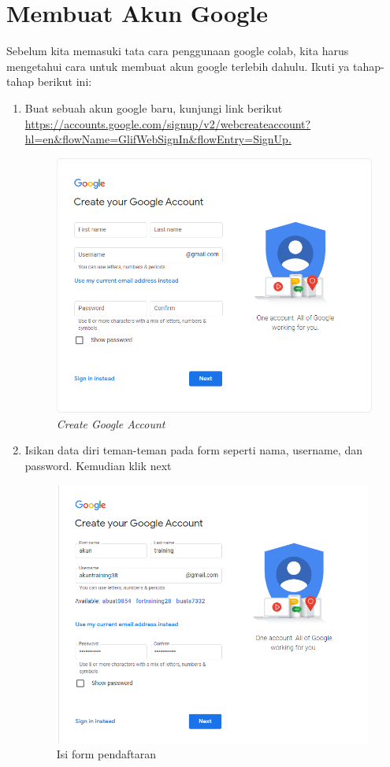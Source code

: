 \section{Membuat Akun Google}
Sebelum kita memasuki tata cara penggunaan google colab, kita harus mengetahui cara untuk membuat akun google terlebih dahulu. Ikuti ya tahap-tahap berikut ini:
\begin{enumerate}

\item Buat sebuah akun google baru, kunjungi link berikut \url{https://accounts.google.com/signup/v2/webcreateaccount?hl=en&flowName=GlifWebSignIn&flowEntry=SignUp.}
\begin{figure}[H]
    \centering
    \includegraphics[scale=0.5]{figures/google1}
    \caption{\textit{Create Google Account}}
    \label{google1}
\end{figure}

\item Isikan data diri teman-teman pada form seperti nama, username, dan password. Kemudian klik next
\begin{figure}[H]
    \centering
    \includegraphics[scale=0.5]{figures/google2}
    \caption{Isi form pendaftaran}
    \label{google2}
\end{figure}


\end{enumerate}
